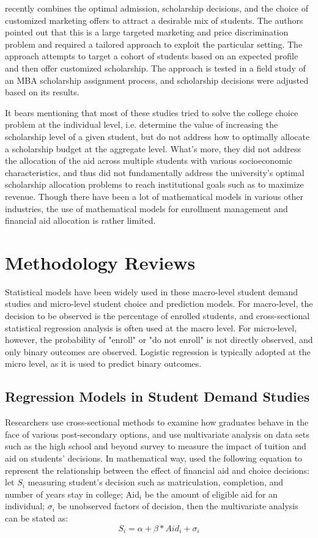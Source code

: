 \documentclass[12pt,english]{report}
\begin{document}
\citet{Belloni2012} recently combines the optimal admission, scholarship decisions, and the choice of customized marketing offers 
to attract a desirable mix of students.  The authors pointed out that this is a large targeted  marketing and price 
discrimination problem and required a tailored approach to exploit the particular setting.  The approach attempts to target a 
cohort of students based on an expected profile and then offer customized scholarship. The approach is tested in a field study of 
an MBA scholarship assignment process, and scholarship decisions were adjusted based on its results.

It bears mentioning that most of these studies tried to solve the college choice problem at the individual level, i.e. determine the value of increasing the scholarship level of a given student, but do not address how to optimally allocate a scholarship budget at the aggregate level. What's more, they did not address the allocation of the aid  across multiple students with various socioeconomic characteristics, and thus did not fundamentally address the university's optimal scholarship allocation problems to reach institutional goals such as to maximize revenue.  Though there have been a lot of mathematical models in various other industries, the use of mathematical models for enrollment management and financial aid allocation is rather limited.

\section{Methodology Reviews}
Statistical models have been widely used in these macro-level student 
demand studies and micro-level student choice and prediction models. 
For macro-level, the decision to be observed is the percentage of 
enrolled students, and cross-sectional statistical regression 
analysis is often used at the macro level. For micro-level, however, 
the probability of "enroll" or "do not enroll" is not directly 
observed, and only binary outcomes are observed. Logistic regression 
is typically adopted at the micro level, as it is used to predict 
binary outcomes.

\subsection{Regression Models in Student Demand Studies}
Researchers use cross-sectional methods to examine how graduates behave in the face of various post-secondary options, and use multivariate analysis on data sets such as the high school and beyond survey to measure the impact of tuition and aid on students' decisions. In mathematical way,
\citet{Dynarski2002} used the following equation to represent the relationship between the effect of financial aid and choice decisions:
let $S_i$ measuring student's decision such as matriculation, completion, and number of years stay in college; Aid$_i$ be the amount of eligible aid for an individual; $\sigma_i$  be unobserved factors of decision, then the multivariate analysis can be stated as: $$S_i = \alpha + \beta * Aid_i + \sigma_i$$
\end{document}
